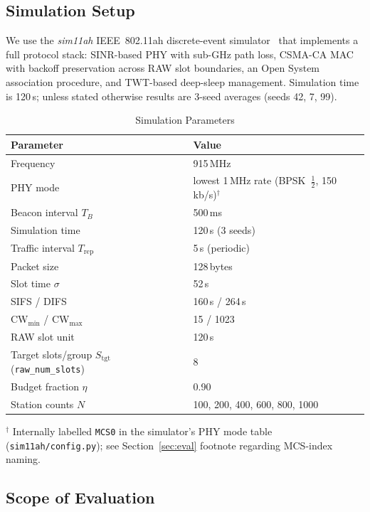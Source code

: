 \documentclass[journal]{IEEEtran}
\begin{document}
\subsection{Simulation Setup}

We use the \textit{sim11ah} IEEE~802.11ah discrete-event
simulator~\cite{kalita2025} that implements a full protocol stack:
SINR-based PHY with sub-GHz path loss, CSMA-CA MAC with backoff
preservation across RAW slot boundaries, an Open System association
procedure, and TWT-based deep-sleep management.
Simulation time is 120\,s; unless stated otherwise results are
3-seed averages (seeds 42, 7, 99).

\begin{table}[!t]
\renewcommand{\arraystretch}{1.15}
\caption{Simulation Parameters}
\label{tab:simparams}
\centering
\begin{tabular}{@{}ll@{}}
\toprule
\textbf{Parameter} & \textbf{Value} \\
\midrule
Frequency              & 915\,MHz \\
PHY mode               & lowest 1\,MHz rate (BPSK~$\frac{1}{2}$, 150\,kb/s)$^\dagger$ \\
Beacon interval $T_B$  & 500\,ms \\
Simulation time        & 120\,s (3 seeds) \\
Traffic interval $T_\mathrm{rep}$ & 5\,s (periodic) \\
Packet size            & 128\,bytes \\
Slot time $\sigma$     & 52\,\textmu{}s \\
SIFS / DIFS            & 160\,\textmu{}s / 264\,\textmu{}s \\
CW$_\mathrm{min}$ / CW$_\mathrm{max}$ & 15 / 1023 \\
RAW slot unit          & 120\,\textmu{}s \\
Target slots/group $S_\mathrm{tgt}$ (\texttt{raw\_num\_slots}) & 8 \\
Budget fraction $\eta$ & 0.90 \\
Station counts $N$     & 100, 200, 400, 600, 800, 1000 \\
\bottomrule
\end{tabular}

\smallskip
\footnotesize $^\dagger$ Internally labelled \texttt{MCS0} in the
simulator's PHY mode table (\texttt{sim11ah/config.py}); see
Section~\ref{sec:eval} footnote regarding MCS-index naming.
\end{table}

\subsection{Scope of Evaluation}
\label{sec:scope}
\end{document}
